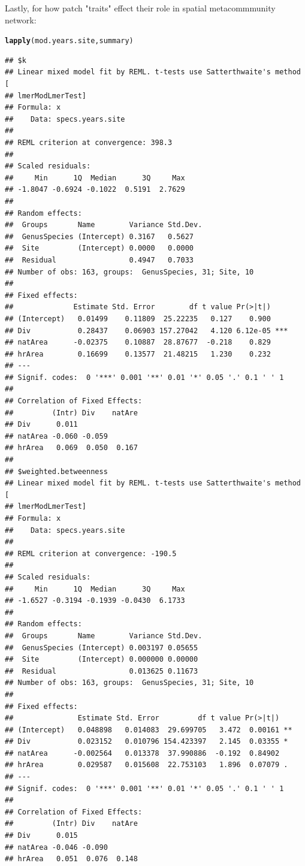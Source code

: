 \documentclass{article}\usepackage[]{graphicx}\usepackage[]{color}
\makeatletter
\newcommand{\hlstd}[1]{\textcolor[rgb]{0.345,0.345,0.345}{#1}}%
\newcommand{\hlkwd}[1]{\textcolor[rgb]{0.737,0.353,0.396}{\textbf{#1}}}%
\newenvironment{kframe}{%
 \def\at@end@of@kframe{}%
 \ifinner\ifhmode%
  \def\at@end@of@kframe{\end{minipage}}%
  \begin{minipage}{\columnwidth}%
 \fi\fi%
 \def\FrameCommand##1{\hskip\@totalleftmargin \hskip-\fboxsep
 \colorbox{shadecolor}{##1}\hskip-\fboxsep
     \hskip-\linewidth \hskip-\@totalleftmargin \hskip\columnwidth}%
 \MakeFramed {\advance\hsize-\width
   \@totalleftmargin\z@ \linewidth\hsize
   \@setminipage}}%
 {\par\unskip\endMakeFramed%
 \at@end@of@kframe}
\newenvironment{knitrout}{}{} %
\makeatother
\begin{document}
\clearpage

Lastly, for how patch "traits" effect their role in spatial  metacommmunity network: 
\begin{knitrout}
\color{fgcolor}\begin{kframe}
\begin{alltt}
\hlkwd{lapply}\hlstd{(mod.years.site, summary)}
\end{alltt}
\begin{verbatim}
## $k
## Linear mixed model fit by REML. t-tests use Satterthwaite's method [
## lmerModLmerTest]
## Formula: x
##    Data: specs.years.site
## 
## REML criterion at convergence: 398.3
## 
## Scaled residuals: 
##     Min      1Q  Median      3Q     Max 
## -1.8047 -0.6924 -0.1022  0.5191  2.7629 
## 
## Random effects:
##  Groups       Name        Variance Std.Dev.
##  GenusSpecies (Intercept) 0.3167   0.5627  
##  Site         (Intercept) 0.0000   0.0000  
##  Residual                 0.4947   0.7033  
## Number of obs: 163, groups:  GenusSpecies, 31; Site, 10
## 
## Fixed effects:
##              Estimate Std. Error        df t value Pr(>|t|)    
## (Intercept)   0.01499    0.11809  25.22235   0.127    0.900    
## Div           0.28437    0.06903 157.27042   4.120 6.12e-05 ***
## natArea      -0.02375    0.10887  28.87677  -0.218    0.829    
## hrArea        0.16699    0.13577  21.48215   1.230    0.232    
## ---
## Signif. codes:  0 '***' 0.001 '**' 0.01 '*' 0.05 '.' 0.1 ' ' 1
## 
## Correlation of Fixed Effects:
##         (Intr) Div    natAre
## Div      0.011              
## natArea -0.060 -0.059       
## hrArea   0.069  0.050  0.167
## 
## $weighted.betweenness
## Linear mixed model fit by REML. t-tests use Satterthwaite's method [
## lmerModLmerTest]
## Formula: x
##    Data: specs.years.site
## 
## REML criterion at convergence: -190.5
## 
## Scaled residuals: 
##     Min      1Q  Median      3Q     Max 
## -1.6527 -0.3194 -0.1939 -0.0430  6.1733 
## 
## Random effects:
##  Groups       Name        Variance Std.Dev.
##  GenusSpecies (Intercept) 0.003197 0.05655 
##  Site         (Intercept) 0.000000 0.00000 
##  Residual                 0.013625 0.11673 
## Number of obs: 163, groups:  GenusSpecies, 31; Site, 10
## 
## Fixed effects:
##               Estimate Std. Error         df t value Pr(>|t|)   
## (Intercept)   0.048898   0.014083  29.699705   3.472  0.00161 **
## Div           0.023152   0.010796 154.423397   2.145  0.03355 * 
## natArea      -0.002564   0.013378  37.990886  -0.192  0.84902   
## hrArea        0.029587   0.015608  22.753103   1.896  0.07079 . 
## ---
## Signif. codes:  0 '***' 0.001 '**' 0.01 '*' 0.05 '.' 0.1 ' ' 1
## 
## Correlation of Fixed Effects:
##         (Intr) Div    natAre
## Div      0.015              
## natArea -0.046 -0.090       
## hrArea   0.051  0.076  0.148
\end{verbatim}
\end{kframe}
\end{knitrout}
\end{document}
